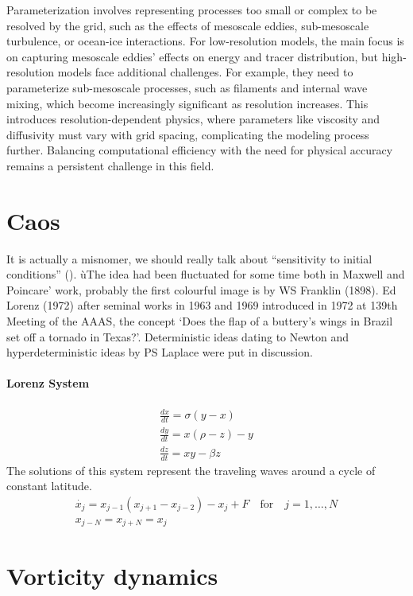 Parameterization involves representing processes too small or complex to be resolved by the grid, such as the effects of mesoscale eddies, sub-mesoscale turbulence, or ocean-ice interactions. For low-resolution models, the main focus is on capturing mesoscale eddies' effects on energy and tracer distribution, but high-resolution models face additional challenges. For example, they need to parameterize sub-mesoscale processes, such as filaments and internal wave mixing, which become increasingly significant as resolution increases. This introduces resolution-dependent physics, where parameters like viscosity and diffusivity must vary with grid spacing, complicating the modeling process further. Balancing computational efficiency with the need for physical accuracy remains a persistent challenge in this field.

\section{Caos}
It is actually a misnomer, we should really talk about “sensitivity to initial conditions” (\cite{chaosbook}).
ùThe idea had been fluctuated for some time both in Maxwell and Poincare’ work, probably the first colourful image is by WS Franklin (1898). Ed Lorenz (1972) after seminal works in 1963 and 1969 introduced in 1972 at 139th Meeting of the AAAS, the concept ‘Does the flap of a buttery’s wings in Brazil set off a tornado in Texas?’.
Deterministic ideas dating to Newton and hyperdeterministic ideas by PS Laplace were put in discussion.
\paragraph{Lorenz System}
\begin{align}\label{eq.lorenz system}
\frac{dx}{dt}=\sigma(y-x)\\
\frac{dy}{dt}=x(\rho-z)-y\\
\frac{dz}{dt}=xy-\beta z
\end{align}
The solutions of this system represent the traveling waves around a cycle of constant latitude.
\begin{align*}
	\dot{x_j}=x_{j-1}(x_{j+1}-x_{j-2})-x_j+F \quad \text{for} \quad j=1,\dots,N\\
	x_{j-N}=x_{j+N}=x_j
\end{align*}
\section{Vorticity dynamics}

